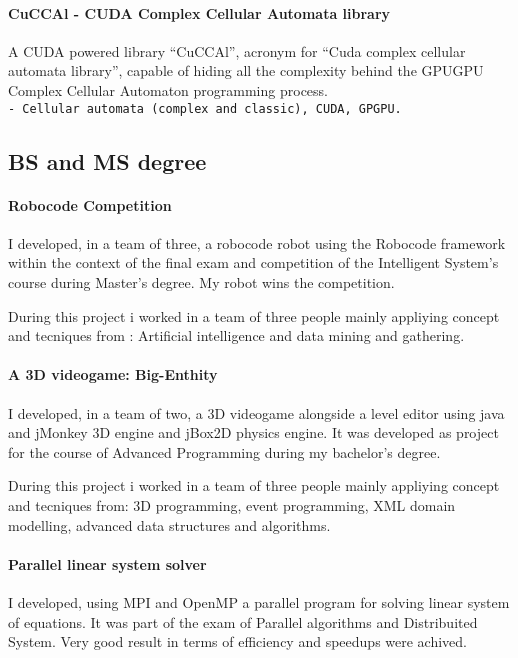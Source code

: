 \documentclass[a4paper,10pt]{article}
\begin{document}
\paragraph{CuCCAl - CUDA Complex Cellular Automata library} 
A CUDA powered library “CuCCAl”, acronym for “Cuda complex cellular
automata library”, capable of hiding all the complexity behind the GPUGPU
Complex Cellular Automaton programming process.
\hfill \\
\texttt{- 
\noindent Cellular automata (complex and classic), CUDA, GPGPU.}

 \subsection{BS and MS degree}

\paragraph{Robocode Competition} 
I developed, in a team of three, a robocode robot using the Robocode framework
within the context of the final exam and competition of the Intelligent System's
course during Master's degree. My robot wins the competition.

\noindent During this project i worked in a team of three people mainly
appliying concept and tecniques from :
\noindent Artificial intelligence and data mining and gathering.
 

 \paragraph{A 3D videogame: Big-Enthity } 

I developed, in a team of two, a 3D videogame alongside a level editor using
java and jMonkey 3D engine and jBox2D physics engine.
It was developed as project for the course of Advanced Programming during my
bachelor's degree.

\noindent During this project i worked in a team of three people mainly
appliying concept and tecniques from:
\noindent 3D programming, event programming, XML domain modelling, advanced
data structures and algorithms.

 \paragraph{Parallel linear system solver} 

I developed, using MPI and OpenMP a  parallel program for solving linear system
of equations. It was part of the exam of Parallel algorithms and
Distribuited System. Very good result in terms of efficiency and speedups were
achived.
\end{document}
